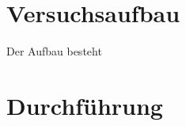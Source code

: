 \section{Versuchsaufbau}
\label{sec:Versuchsaufbau}

Der Aufbau besteht 

\section{Durchführung}
\label{sec:Durchführung}
